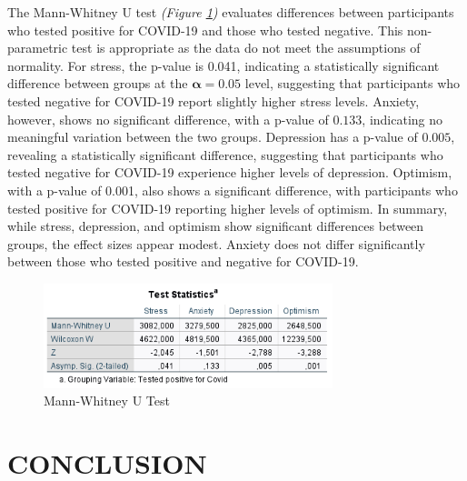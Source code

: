 \documentclass[a4paper]{article}
\begin{document}
\vspace{3em}\noindent
The Mann-Whitney U test \textit{(Figure \ref{fig:mannWhitney})} evaluates differences between participants who tested positive for COVID-19 and those who tested negative.
This non-parametric test is appropriate as the data do not meet the assumptions of normality.\newline
For stress, the p-value is 0.041, indicating a statistically significant difference between groups at the \(\boldsymbol{\alpha = 0.05}\) level,
suggesting that participants who tested negative for COVID-19 report slightly higher stress levels.
Anxiety, however, shows no significant difference, with a p-value of \(\boldsymbol{0.133}\), indicating no meaningful variation between the two groups.
Depression has a p-value of \(\boldsymbol{0.005}\), revealing a statistically significant difference, suggesting that participants who tested negative for COVID-19 experience higher levels of depression.
Optimism, with a p-value of 0.001, also shows a significant difference, with participants who tested positive for COVID-19 reporting higher levels of optimism.
\vspace{0.5em}\newline
In summary, while stress, depression, and optimism show significant differences between groups, the effect sizes appear modest.
Anxiety does not differ significantly between those who tested positive and negative for COVID-19.

\begin{figure}[H]
  \centering
  \caption{Mann-Whitney U Test}
  \label{fig:mannWhitney}
  \includegraphics[width=0.75\textwidth]{img/mann-whitney.png}  %
\end{figure}

\setlength{\textfloatsep}{50pt}
\section{CONCLUSION}
\vspace{0.5em}
\end{document}
